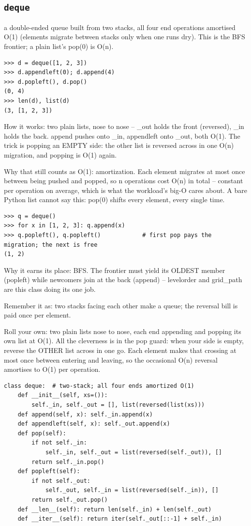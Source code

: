 \documentclass[10pt,letterpaper]{book}
\begin{document}
\subsection{\texttt{deque}}\label{def:deque}
a double-ended queue built from two stacks, all four end operations amortised O(1) (elements migrate between stacks only when one runs dry). This is the BFS frontier; a plain list's pop(0) is O(n).
\begin{lstlisting}[style=ex]
>>> d = deque([1, 2, 3])
>>> d.appendleft(0); d.append(4)
>>> d.popleft(), d.pop()
(0, 4)
>>> len(d), list(d)
(3, [1, 2, 3])
\end{lstlisting}

How it works: two plain lists, nose to nose -- \_out holds the front (reversed), \_in holds the back. append pushes onto \_in, appendleft onto \_out, both O(1). The trick is popping an EMPTY side: the other list is reversed across in one O(n) migration, and popping is O(1) again.


Why that still counts as O(1): amortization. Each element migrates at most once between being pushed and popped, so n operations cost O(n) in total -- constant per operation on average, which is what the workload's big-O cares about. A bare Python list cannot say this: pop(0) shifts every element, every single time.

\begin{lstlisting}[style=ex]
>>> q = deque()
>>> for x in [1, 2, 3]: q.append(x)
>>> q.popleft(), q.popleft()            # first pop pays the migration; the next is free
(1, 2)
\end{lstlisting}

Why it earns its place: BFS. The frontier must yield its OLDEST member (popleft) while newcomers join at the back (append) -- levelorder and grid\_path are this class doing its one job.


Remember it as: two stacks facing each other make a queue; the reversal bill is paid once per element.


Roll your own: two plain lists nose to nose, each end appending and popping its own list at O(1). All the cleverness is in the pop guard: when your side is empty, reverse the OTHER list across in one go. Each element makes that crossing at most once between entering and leaving, so the occasional O(n) reversal amortises to O(1) per operation.

\begin{lstlisting}[style=ex]
class deque:  # two-stack; all four ends amortized O(1)
    def __init__(self, xs=()):
        self._in, self._out = [], list(reversed(list(xs)))
    def append(self, x): self._in.append(x)
    def appendleft(self, x): self._out.append(x)
    def pop(self):
        if not self._in:
            self._in, self._out = list(reversed(self._out)), []
        return self._in.pop()
    def popleft(self):
        if not self._out:
            self._out, self._in = list(reversed(self._in)), []
        return self._out.pop()
    def __len__(self): return len(self._in) + len(self._out)
    def __iter__(self): return iter(self._out[::-1] + self._in)
\end{lstlisting}
\end{document}
